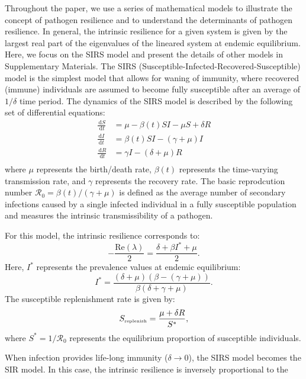 \documentclass[12pt]{article}
\newcommand{\tsub}[2]{#1_{{\textrm{\tiny #2}}}}
\newcommand{\dd}[1]{\ensuremath{\, \mathrm{d}#1}}
\begin{document}
Throughout the paper, we use a series of mathematical models to illustrate the concept of pathogen resilience and to understand the determinants of pathogen resilience.
In general, the intrinsic resilience for a given system is given by the largest real part of the eigenvalues of the lineared system at endemic equilibrium.
Here, we focus on the SIRS model and present the details of other models in Supplementary Materials.
The SIRS (Susceptible-Infected-Recovered-Susceptible) model is the simplest model that allows for waning of immunity, where recovered (immune) individuals are assumed to become fully susceptible after an average of $1/\delta$ time period.
The dynamics of the SIRS model is described by the following set of differential equations:
\begin{align}
\frac{\dd S}{\dd t} &= \mu - \beta(t) SI - \mu S + \delta R \\
\frac{\dd I}{\dd t} &= \beta(t) SI - (\gamma + \mu) I \\
\frac{\dd R}{\dd t} &= \gamma I - (\delta + \mu) R \\
\end{align}
where $\mu$ represents the birth/death rate, $\beta(t)$ represents the time-varying transmission rate, and $\gamma$ represents the recovery rate.
The basic reprodcution number $\mathcal R_0 = \beta(t)/(\gamma + \mu)$ is defined as the average number of secondary infections caused by a single infected individual in a fully susceptible population and measures the intrinsic transmissibility of a pathogen.

For this model, the intrinsic resilience corresponds to:
\begin{equation}
-\frac{\mathrm{Re}(\lambda)}{2} = \frac{\delta + \beta I^{\ast} + \mu}{2}.
\end{equation}
Here, $I^{\ast}$ represents the prevalence values at endemic equilibrium:
\begin{equation}
I^{\ast} = \frac{(\delta + \mu)(\beta - (\gamma + \mu))}{\beta(\delta + \gamma + \mu)}.
\end{equation}
The susceptible replenishment rate is given by:
\begin{equation}
\tsub{S}{replenish} = \frac{\mu + \delta R}{S^\ast},
\end{equation}
where $S^\ast = 1/\mathcal R_0$ represents the equilibrium proportion of susceptible individuals.

When infection provides life-long immunity ($\delta \to 0$), the SIRS model becomes the SIR model.
In this case, the intrinsic resilience is inversely proportional to the 
\end{document}
